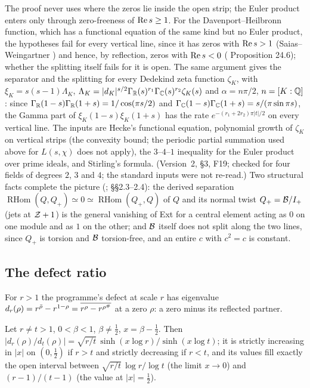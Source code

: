The proof never uses where the zeros lie inside the open strip; the Euler product enters only through zero-freeness of $\operatorname{Re} s\ge1$. For the Davenport--Heilbronn function, which has a functional equation of the same kind but no Euler product, the hypotheses fail for every vertical line, since it has zeros with $\operatorname{Re} s>1$ (Saias--Weingartner \cite{SaiasWeingartner}) and hence, by reflection, zeros with $\operatorname{Re} s<0$ ( Proposition 24.6); whether the splitting itself fails for it is open.
The same argument gives the separator and the splitting for every Dedekind zeta function $\zeta_K$, with $\xi_K=s(s-1)\Lambda_K$, $\Lambda_K=|d_K|^{s/2}\Gamma_{\mathbb{R}}(s)^{r_1}\Gamma_{\mathbb{C}}(s)^{r_2}\zeta_K(s)$ and $\alpha=n\pi/2$, $n=[K:\mathbb{Q}]$: since $\Gamma_{\mathbb{R}}(1-s)\Gamma_{\mathbb{R}}(1+s)=1/\cos(\pi s/2)$ and $\Gamma_{\mathbb{C}}(1-s)\Gamma_{\mathbb{C}}(1+s)=s/(\pi\sin\pi s)$, the Gamma part of $\xi_K(1-s)\xi_K(1+s)$ has the rate $e^{-(r_1+2r_2)\pi|t|/2}$ on every vertical line. The inputs are Hecke's functional equation, polynomial growth of $\zeta_K$ on vertical strips (the convexity bound; the periodic partial summation used above for $L(s,\chi)$ does not apply), the $3$--$4$--$1$ inequality for the Euler product over prime ideals, and Stirling's formula. (Version~2,  §3, F19; checked for four fields of degrees $2$, $3$ and $4$; the standard inputs were not re-read.)
Two structural facts complete the picture (;  §§2.3--2.4): the derived separation $\operatorname{RHom}(Q,Q_+)\simeq0\simeq\operatorname{RHom}(Q_+,Q)$ of $Q$ and its normal twist $Q_+=\mathcal{B}/I_+$ (jets at $\mathcal{Z}+1$) is the general vanishing of Ext for a central element acting as $0$ on one module and as $1$ on the other; and $\mathcal{B}$ itself does not split along the two lines, since $Q_+$ is torsion and $\mathcal{B}$ torsion-free, and an entire $c$ with $c^2=c$ is constant.

\subsection{The defect ratio}

For $r>1$ the programme's defect at scale $r$ has eigenvalue $d_r(\rho)=r^{\bar\rho}-r^{1-\rho}=\overline{r^\rho-r^{\rho^\#}}$ at a zero $\rho$: a zero minus its reflected partner.

\begin{lemma}\label{lem:defect}
Let $r\ne t>1$, $0<\beta<1$, $\beta\ne\tfrac12$, $x=\beta-\tfrac12$. Then $|d_r(\rho)/d_t(\rho)|=\sqrt{r/t}\,\sinh(x\log r)/\sinh(x\log t)$; it is strictly increasing in $|x|$ on $(0,\tfrac12)$ if $r>t$ and strictly decreasing if $r<t$, and its values fill exactly the open interval between $\sqrt{r/t}\,\log r/\log t$ (the limit $x\to0$) and $(r-1)/(t-1)$ (the value at $|x|=\tfrac12$).
\end{lemma}

